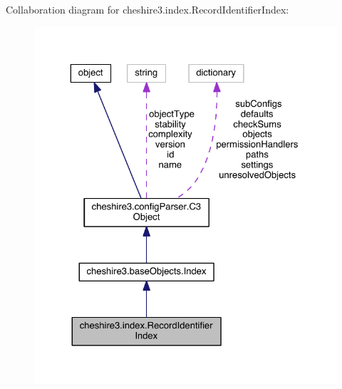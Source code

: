 Collaboration diagram for cheshire3.\-index.\-Record\-Identifier\-Index\-:
\nopagebreak
\begin{figure}[H]
\begin{center}
\leavevmode
\includegraphics[width=325pt]{classcheshire3_1_1index_1_1_record_identifier_index__coll__graph}
\end{center}
\end{figure}
